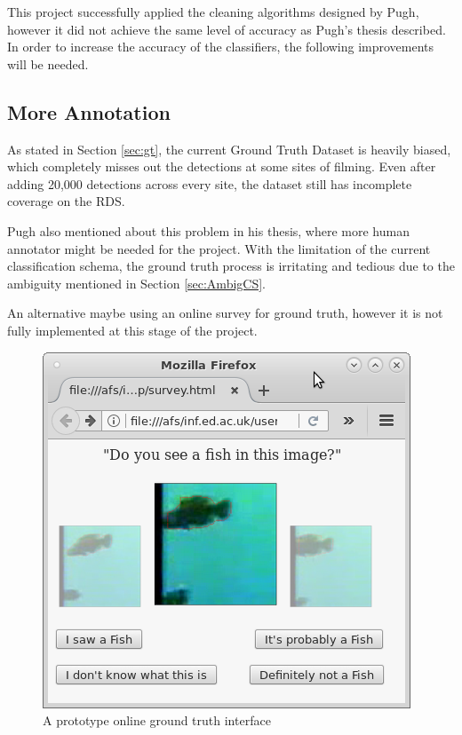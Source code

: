 \documentclass[bsc,logo,twoside,fullspacing,parskip]{infthesis}
\begin{document}
This project successfully applied the cleaning algorithms designed by Pugh\cite{Pugh}, however it did not achieve the same level of accuracy as Pugh's thesis described.
In order to increase the accuracy of the classifiers, the following improvements will be needed.

\subsection{More Annotation}

As stated in Section \ref{sec:gt}, the current Ground Truth Dataset is heavily biased, which completely misses out the detections at some sites of filming. 
Even after adding 20,000 detections across every site, the dataset still has incomplete coverage on the RDS. 

Pugh also mentioned about this problem in his thesis, where more human annotator might be needed for the project.
With the limitation of the current classification schema, the ground truth process is irritating and tedious due to the ambiguity mentioned in Section \ref{sec:AmbigCS}.

An alternative maybe using an online survey for ground truth, however it is not fully implemented at this stage of the project. 

\begin{figure}[!h]
    \centering
    \includegraphics[scale=0.38]{graph/query.png}
    \caption{A prototype online ground truth interface}
    \label{fig:gto}
\end{figure}
\end{document}

